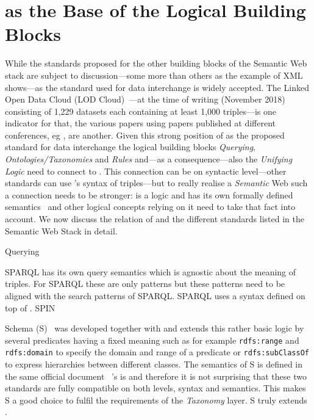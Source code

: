 \section{\rdf as the Base of the Logical Building Blocks}
While the standards proposed for the other building blocks of the Semantic Web stack are subject to discussion---some more than others as the example of XML shows---\rdf as 
the standard 
used for data interchange is widely accepted. The Linked Open Data Cloud (LOD Cloud)~\cite{LODCloud}---at the time of writing (November 2018) 
consisting of 1,229 datasets each containing at least 1,000 \rdf triples---is one indicator for that, the various papers using \rdf papers 
published at different conferences, eg \cite{iswc,eswc},
are another. 
Given this strong position of \rdf as the proposed standard for data interchange 
the logical building blocks \emph{Querying}, \emph{Ontologies/Taxonomies} and \emph{Rules} and---as a consequence---also the
\emph{Unifying Logic} need to connect to \rdf. 
This connection can be on syntactic level---other standards can use \rdf's syntax of triples---but to really realise a \emph{Semantic} Web 
such a connection needs to be stronger:
\rdf is a logic and has its own formally defined semantics~\cite{RDFSemantics} and other logical concepts relying on it need to take that fact into account. 
We now discuss the relation of \rdf and the different standards listed in the Semantic Web Stack in detail.

Querying

SPARQL has its own query semantics which is agnostic about the meaning of \rdf triples. For SPARQL these are only patterns but these patterns need to be aligned 
with the search patterns of SPARQL.
SPARQL uses a syntax defined on top of \rdf. 
SPIN~\cite{spin}



\rdf Schema (\rdf{}S)~\cite{RDFS} was developed together with \rdf and extends this rather basic logic by several predicates having a fixed meaning such as for example 
\texttt{rdfs:range} and \texttt{rdfs:domain} to specify the domain and range of a predicate or \texttt{rdfs:subClassOf} to express hierarchies between different classes.
The semantics of \rdf{}S is defined in the same official document~\cite{RDFSemantics} \rdf's is and therefore it is not surprising that these two standards are fully compatible
on both levels, syntax and semantics. 
This makes \rdf{}S a good choice  to fulfil the requirements of the \emph{Taxonomy} layer. \rdf{}S truly extends \rdf. 

